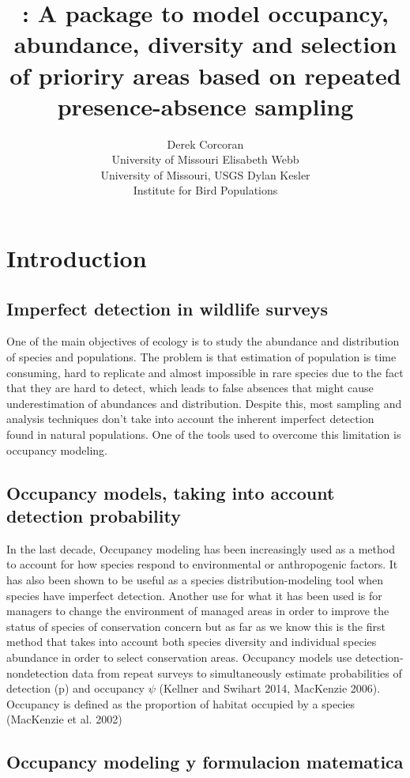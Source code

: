 \documentclass[article]{jss}
\author{
Derek Corcoran\\University of Missouri \And Elisabeth Webb\\University of Missouri, USGS \And Dylan Kesler\\Institute for Bird Populations
}
\title{\pkg{DiversityOccupancy}: A package to model occupancy, abundance,
diversity and selection of prioriry areas based on repeated
presence-absence sampling}
\begin{document}
\section{Introduction}\label{introduction}

\subsection{Imperfect detection in wildlife
surveys}\label{imperfect-detection-in-wildlife-surveys}

One of the main objectives of ecology is to study the abundance and
distribution of species and populations. The problem is that estimation
of population is time consuming, hard to replicate and almost impossible
in rare species due to the fact that they are hard to detect, which
leads to false absences that might cause underestimation of abundances
and distribution. Despite this, most sampling and analysis techniques
don't take into account the inherent imperfect detection found in
natural populations. One of the tools used to overcome this limitation
is occupancy modeling.

\subsection{Occupancy models, taking into account detection
probability}\label{occupancy-models-taking-into-account-detection-probability}

In the last decade, Occupancy modeling has been increasingly used as a
method to account for how species respond to environmental or
anthropogenic factors. It has also been shown to be useful as a species
distribution-modeling tool when species have imperfect detection.
Another use for what it has been used is for managers to change the
environment of managed areas in order to improve the status of species
of conservation concern
\citep{mackenzie_estimating_2002, mackenzie2006occupancy} but as far as
we know this is the first method that takes into account both species
diversity and individual species abundance in order to select
conservation areas. Occupancy models use detection-nondetection data
from repeat surveys to simultaneously estimate probabilities of
detection (p) and occupancy \(\psi\) (Kellner and Swihart 2014,
MacKenzie 2006). Occupancy is defined as the proportion of habitat
occupied by a species (MacKenzie et al. 2002)

\subsection{Occupancy modeling y formulacion
matematica}\label{occupancy-modeling-y-formulacion-matematica}
\end{document}
